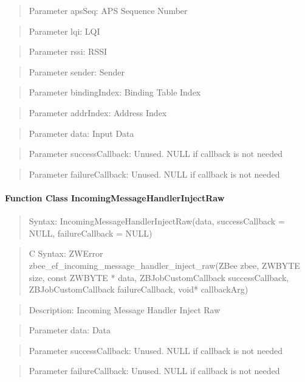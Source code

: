 \begin{quote}Parameter apsSeq: APS Sequence Number\end{quote}
\begin{quote}Parameter lqi: LQI\end{quote}
\begin{quote}Parameter rssi: RSSI\end{quote}
\begin{quote}Parameter sender: Sender\end{quote}
\begin{quote}Parameter bindingIndex: Binding Table Index\end{quote}
\begin{quote}Parameter addrIndex: Address Index\end{quote}
\begin{quote}Parameter data: Input Data\end{quote}
\begin{quote}Parameter successCallback: Unused. NULL if callback is not needed\end{quote}
\begin{quote}Parameter failureCallback: Unused. NULL if callback is not needed\end{quote}


\paragraph{Function Class IncomingMessageHandlerInjectRaw}
\begin{quote}Syntax: IncomingMessageHandlerInjectRaw(data, successCallback = NULL, failureCallback = NULL)\end{quote}
\begin{quote}C Syntax: ZWError zbee\_ef\_incoming\_message\_handler\_inject\_raw(ZBee zbee, ZWBYTE size, const ZWBYTE * data, ZBJobCustomCallback successCallback, ZBJobCustomCallback failureCallback, void* callbackArg)\end{quote}
\begin{quote}Description: Incoming Message Handler Inject Raw\end{quote}
\begin{quote}Parameter data: Data\end{quote}
\begin{quote}Parameter successCallback: Unused. NULL if callback is not needed\end{quote}
\begin{quote}Parameter failureCallback: Unused. NULL if callback is not needed\end{quote}

